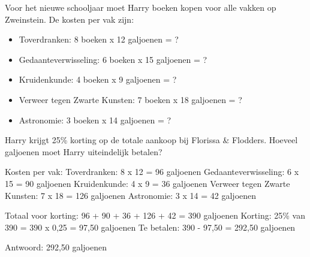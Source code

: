 \begin{opgave}
Voor het nieuwe schooljaar moet Harry boeken kopen voor alle vakken op Zweinstein.
De kosten per vak zijn:

\begin{itemize}
\item Toverdranken: 8 boeken x 12 galjoenen = ?
\item Gedaanteverwisseling: 6 boeken x 15 galjoenen = ?
\item Kruidenkunde: 4 boeken x 9 galjoenen = ?
\item Verweer tegen Zwarte Kunsten: 7 boeken x 18 galjoenen = ?
\item Astronomie: 3 boeken x 14 galjoenen = ?
\end{itemize}

Harry krijgt 25\% korting op de totale aankoop bij Florissa \& Flodders.
Hoeveel galjoenen moet Harry uiteindelijk betalen?
\end{opgave}

\begin{oplossing}
Kosten per vak:
Toverdranken: 8 x 12 = 96 galjoenen
Gedaanteverwisseling: 6 x 15 = 90 galjoenen
Kruidenkunde: 4 x 9 = 36 galjoenen
Verweer tegen Zwarte Kunsten: 7 x 18 = 126 galjoenen
Astronomie: 3 x 14 = 42 galjoenen

Totaal voor korting: 96 + 90 + 36 + 126 + 42 = 390 galjoenen
Korting: 25\% van 390 = 390 x 0,25 = 97,50 galjoenen
Te betalen: 390 - 97,50 = 292,50 galjoenen

Antwoord: 292,50 galjoenen
\end{oplossing}
